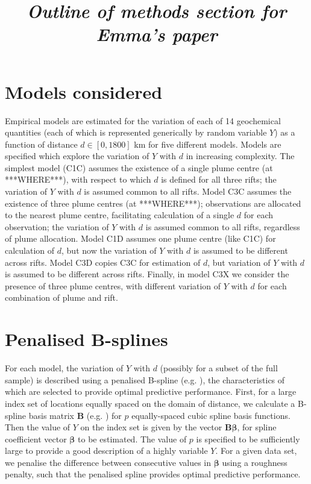 \documentclass[a4paper,10pt]{article}
\newcommand {\un}[1]{\boldsymbol{#1}}
\begin{document}
\title{\textit{Outline of methods section for Emma's paper}}
\author{}
\maketitle


\section*{Models considered}
%
Empirical models are estimated for the variation of each of 14 geochemical quantities (each of which is represented generically by random variable $Y$) as a function of distance $d \in [0,1800]$ km for five different models. Models are specified which explore the variation of $Y$ with $d$ in increasing complexity. The simplest model (C1C) assumes the existence of a single plume centre (at ***WHERE***), with respect to which $d$ is defined for all three rifts; the variation of $Y$ with $d$ is assumed common to all rifts. Model C3C assumes the existence of three plume centres (at ***WHERE***); observations are allocated to the nearest plume centre, facilitating calculation of a single $d$ for each observation; the variation of $Y$ with $d$ is assumed common to all rifts, regardless of plume allocation. Model C1D assumes one plume centre (like C1C) for calculation of $d$, but now the variation of $Y$ with $d$ is assumed to be different across rifts. Model C3D copies C3C for estimation of $d$, but variation of $Y$ with $d$ is assumed to be different across rifts. Finally, in model C3X we consider the presence of three plume centres, with different variation of $Y$ with $d$ for each combination of plume and rift.

\section*{Penalised B-splines}
%
For each model, the variation of $Y$ with $d$ (possibly for a subset of the full sample) is described using a penalised B-spline (e.g. \citealt{ElrMrx96, ElrMrx10}), the characteristics of which are selected to provide optimal predictive performance. First, for a large index set of locations equally spaced on the domain of distance, we calculate a B-spline basis matrix $\un{B}$ (e.g. \citealt{dBr01}) for $p$ equally-spaced cubic spline basis functions. Then the value of $Y$ on the index set is given by the vector $\un{B} \un{\beta}$, for spline coefficient vector $\un{\beta}$ to be estimated. The value of $p$ is specified to be sufficiently large to provide a good description of a highly variable $Y$. For a given data set, we penalise the difference between consecutive values in $\un{\beta}$ using a roughness penalty, such that the penalised spline provides optimal predictive performance.
\end{document}
